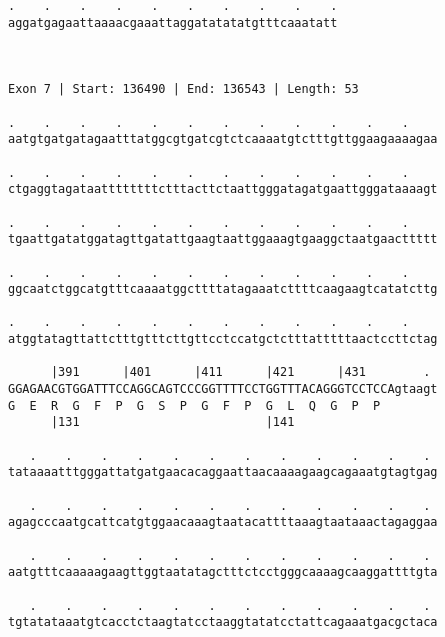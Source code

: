 \documentclass{article}
\begin{document}
\begin{Verbatim}
.    .    .    .    .    .    .    .    .    .
aggatgagaattaaaacgaaattaggatatatatgtttcaaatatt
                                              
                                              
 
Exon 7 | Start: 136490 | End: 136543 | Length: 53
 
.    .    .    .    .    .    .    .    .    .    .    .    
aatgtgatgatagaatttatggcgtgatcgtctcaaaatgtctttgttggaagaaaagaa
                                                            
.    .    .    .    .    .    .    .    .    .    .    .    
ctgaggtagataattttttttctttacttctaattgggatagatgaattgggataaaagt
                                                            
.    .    .    .    .    .    .    .    .    .    .    .    
tgaattgatatggatagttgatattgaagtaattggaaagtgaaggctaatgaacttttt
                                                            
.    .    .    .    .    .    .    .    .    .    .    .    
ggcaatctggcatgtttcaaaatggcttttatagaaatcttttcaagaagtcatatcttg
                                                            
.    .    .    .    .    .    .    .    .    .    .    .    
atggtatagttattctttgtttcttgttcctccatgctctttatttttaactccttctag
                                                            
      |391      |401      |411      |421      |431        . 
GGAGAACGTGGATTTCCAGGCAGTCCCGGTTTTCCTGGTTTACAGGGTCCTCCAgtaagt
G  E  R  G  F  P  G  S  P  G  F  P  G  L  Q  G  P  P        
      |131                          |141                    
  
   .    .    .    .    .    .    .    .    .    .    .    . 
tataaaatttgggattatgatgaacacaggaattaacaaaagaagcagaaatgtagtgag
                                                            
   .    .    .    .    .    .    .    .    .    .    .    . 
agagcccaatgcattcatgtggaacaaagtaatacattttaaagtaataaactagaggaa
                                                            
   .    .    .    .    .    .    .    .    .    .    .    . 
aatgtttcaaaaagaagttggtaatatagctttctcctgggcaaaagcaaggattttgta
                                                            
   .    .    .    .    .    .    .    .    .    .    .    . 
tgtatataaatgtcacctctaagtatcctaaggtatatcctattcagaaatgacgctaca
                                                            

\end{Verbatim}
\end{document}
